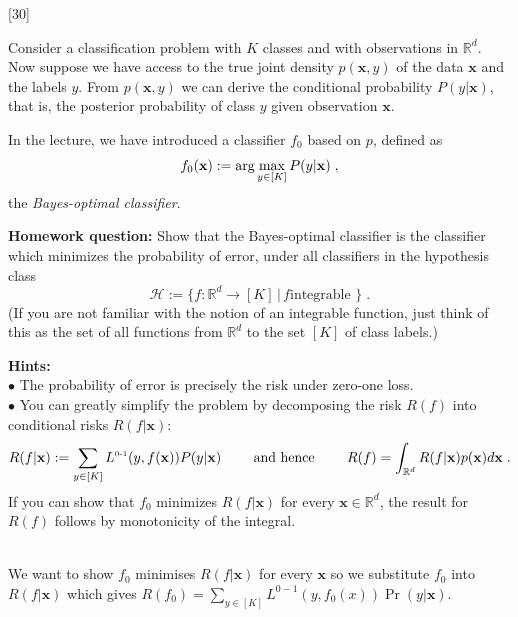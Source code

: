 \documentclass[]{../util/ColumbiaAssm}
\begin{document}
\begin{questions}
\begin{solution}
 
\end{solution} 
 
[30]

\def\x{\mathbf{x}}
Consider a classification problem with $K$ classes and with observations in
$\mathbb{R}^d$. Now suppose we have access to the true joint density $p(\x,y)$
of the data $\x$ and the labels $y$. From $p(\x,y)$ we can derive the
conditional probability $P(y|\x)$, that is, the posterior probability
of class $y$ given observation $\x$.

In the lecture, we have
introduced a classifier $f_0$ based on $p$, defined as
\begin{equation*}
  f_0(\x):=\argmax{y\in [K]} P(y|\x) \;,
\end{equation*}
the \emph{Bayes-optimal classifier}.

\def\Lzeroone{L^{\mbox{\tiny 0-1}}}

\textbf{Homework question:}
Show that the Bayes-optimal classifier is the classifier which
  minimizes the probability of error, under all classifiers in the
  hypothesis class
  \begin{equation*}
    \mathcal{H}:=\lbrace f\!:\mathbb{R}^d\rightarrow[K] \,|\, f \text{
      integrable }\rbrace \;.
  \end{equation*}
  (If you are not familiar with the notion of an integrable function,
  just think of this as the set of all functions from $\mathbb{R}^d$
  to the set $[K]$ of class labels.)
  
  \textbf{Hints:}\\
  $\bullet$ The probability of error is precisely the risk under zero-one
    loss.\\
  $\bullet$ You can greatly simplify the problem by decomposing the risk
    $R(f)$ into conditional risks $R(f|\x)$:
    \begin{equation*}
      R(f|\x):=\sum_{y\in[K]}\Lzeroone(y,f(\x))P(y|\x)
      \qquad\text{ and hence }\qquad
      R(f)=\int_{\mathbb{R}^d}R(f|\x)p(\x)d\x \;.
    \end{equation*}
  \quad If you can show that $f_0$ minimizes $R(f|\x)$ for every
  $\x\in\mathbb{R}^d$, the result for $R(f)$ follows by monotonicity of the integral.
 
\newpage

\begin{solution}
\\ We want to show $f_0$ minimises $R(f|\mathbf{x})$ for every $\mathbf{x}$ so we substitute $f_0$ into $R(f|\mathbf{x})$ which gives $R(f_0) = \sum\limits_{y \in [K]} L^{0-1}(y, f_0(x))\Pr(y|\mathbf{x})$.\\ 


\end{solution}
\end{questions}
\end{document}
